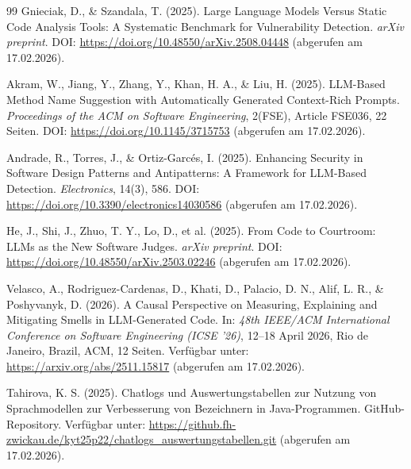 \documentclass[a4paper,12pt]{article}
\begin{document}
\begin{thebibliography}{99}
    Gnieciak, D., \& Szandala, T. (2025).
    Large Language Models Versus Static Code Analysis Tools: A Systematic Benchmark for Vulnerability Detection.
    \textit{arXiv preprint}.
    DOI: \url{https://doi.org/10.48550/arXiv.2508.04448}
    (abgerufen am 17.02.2026).

    Akram, W., Jiang, Y., Zhang, Y., Khan, H. A., \& Liu, H. (2025).
    LLM-Based Method Name Suggestion with Automatically Generated Context-Rich Prompts.
    \textit{Proceedings of the ACM on Software Engineering}, 2(FSE), Article FSE036, 22 Seiten.
    DOI: \url{https://doi.org/10.1145/3715753}
    (abgerufen am 17.02.2026).

    Andrade, R., Torres, J., \& Ortiz-Garcés, I. (2025).
    Enhancing Security in Software Design Patterns and Antipatterns: A Framework for LLM-Based Detection.
    \textit{Electronics}, 14(3), 586.
    DOI: \url{https://doi.org/10.3390/electronics14030586}
    (abgerufen am 17.02.2026).

    He, J., Shi, J., Zhuo, T. Y., Lo, D., et al. (2025).
    From Code to Courtroom: LLMs as the New Software Judges.
    \textit{arXiv preprint}.
    DOI: \url{https://doi.org/10.48550/arXiv.2503.02246}
    (abgerufen am 17.02.2026).

    Velasco, A., Rodriguez-Cardenas, D., Khati, D., Palacio, D. N., Alif, L. R., \& Poshyvanyk, D. (2026).
    A Causal Perspective on Measuring, Explaining and Mitigating Smells in LLM-Generated Code.
    In: \textit{48th IEEE/ACM International Conference on Software Engineering (ICSE ’26)},
    12–18 April 2026, Rio de Janeiro, Brazil, ACM, 12 Seiten.
    Verfügbar unter: \url{https://arxiv.org/abs/2511.15817}
    (abgerufen am 17.02.2026).

    Tahirova, K. S. (2025).
    Chatlogs und Auswertungstabellen zur Nutzung von Sprachmodellen zur Verbesserung von Bezeichnern in Java-Programmen.
    GitHub-Repository.
    Verfügbar unter: \url{https://github.fh-zwickau.de/kyt25p22/chatlogs_auswertungstabellen.git}
    (abgerufen am 17.02.2026).

\end{thebibliography}
\end{document}
